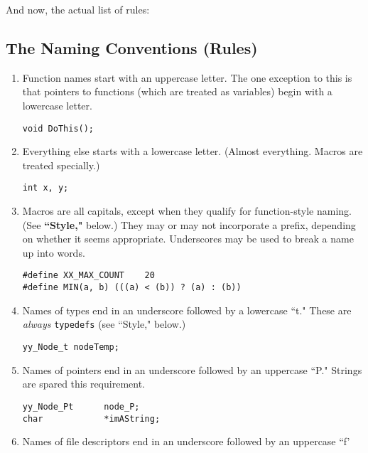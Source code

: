 And now, the actual list of rules:

\subsection{The Naming Conventions (Rules)}

\begin{enumerate}
\item Function names start with an uppercase letter.  The one
exception to this is that pointers to functions (which are treated as
variables) begin with a lowercase letter.

\begin{verbatim}
void DoThis();
\end{verbatim}

\item Everything else starts with a lowercase letter.  (Almost
everything.  Macros are treated specially.)

\begin{verbatim}
int x, y;
\end{verbatim}

\item Macros are all capitals, except when they qualify for
function-style naming.  (See {\bf ``Style,"} below.)  They may or may
not incorporate a prefix, depending on whether it seems appropriate.
Underscores may be used to break a name up into words.
\begin{verbatim}
#define XX_MAX_COUNT    20
#define MIN(a, b) (((a) < (b)) ? (a) : (b))
\end{verbatim}

\item Names of types end in an underscore
followed by a lowercase ``t."  These are {\em always} {\tt typedefs}
(see ``Style," below.)

\begin{verbatim}
yy_Node_t nodeTemp;
\end{verbatim}

\item Names of pointers end in an underscore
followed by an uppercase ``P."
Strings are spared this requirement.

\begin{verbatim}
yy_Node_Pt      node_P;
char            *imAString;
\end{verbatim}

\item Names of file
descriptors end in an underscore followed by an uppercase ``f'


\end{enumerate}
